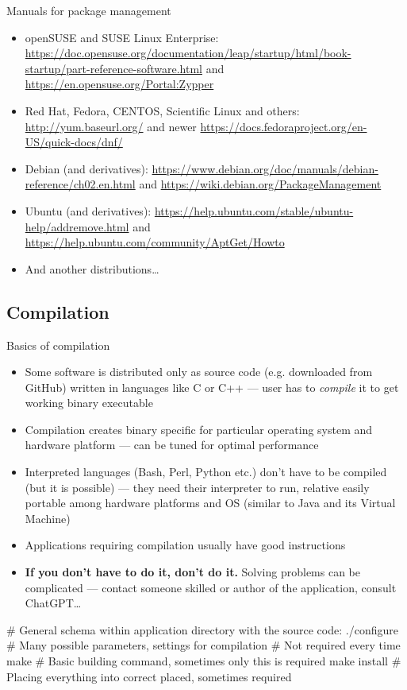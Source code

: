 \documentclass[compress, xelatex, 11pt, xcolor=svgnames, aspectratio=169,
	hyperref={
		bookmarks=true,
		unicode=true,
		colorlinks=true,
		pdftitle={Linux, command line and MetaCentrum},
		plainpages=false,
		pdfauthor={Vojtech Zeisek},
		pdfsubject={Course about use of Linux command line, writing shell scripts and using MetaCentrum of CESNET},
		pdfcreator={XeLaTeX},
		pdfkeywords={Linux, GNU, BASH, shell, command line, MetaCentrum},
		linkcolor=DarkRed, %
		anchorcolor=DarkBlue, %
		citecolor=Indigo, %
		filecolor=NavyBlue, %
		menucolor=DarkMagenta, %
		urlcolor=DarkBlue, %
		},
	url={hyphens, lowtilde} %
	]{beamer}
\begin{document}
\begin{frame}{Manuals for package management}
	\begin{itemize}
		\item openSUSE and SUSE Linux Enterprise: \url{https://doc.opensuse.org/documentation/leap/startup/html/book-startup/part-reference-software.html} and \url{https://en.opensuse.org/Portal:Zypper}
		\item Red Hat, Fedora, CENTOS, Scientific Linux and others: \url{http://yum.baseurl.org/} and newer \url{https://docs.fedoraproject.org/en-US/quick-docs/dnf/}
		\item Debian (and derivatives): \url{https://www.debian.org/doc/manuals/debian-reference/ch02.en.html} and \url{https://wiki.debian.org/PackageManagement}
		\item Ubuntu (and derivatives): \url{https://help.ubuntu.com/stable/ubuntu-help/addremove.html} and \url{https://help.ubuntu.com/community/AptGet/Howto}
		\item And another distributions\ldots
	\end{itemize}
\end{frame}

\subsection{Compilation}

\begin{frame}[fragile]{Basics of compilation}
	\begin{itemize}
		\item Some software is distributed only as source code (e.g. downloaded from GitHub) written in languages like C or C++ --- user has to \textit{compile} it to get working binary executable
		\item Compilation creates binary specific for particular operating system and hardware platform --- can be tuned for optimal performance
		\item Interpreted languages (Bash, Perl, Python etc.) don't have to be compiled (but it is possible) --- they need their interpreter to run, relative easily portable among hardware platforms and OS (similar to Java and its Virtual Machine)
		\item Applications requiring compilation usually have good instructions
		\item \textbf{If you don't have to do it, don't do it.}\textbf{} Solving problems can be complicated --- contact someone skilled or author of the application, consult ChatGPT\ldots
	\end{itemize}
	\begin{bashcode}
    # General schema within application directory with the source code:
    ./configure # Many possible parameters, settings for compilation
                # Not required every time
    make # Basic building command, sometimes only this is required
    make install # Placing everything into correct placed, sometimes required
	\end{bashcode}
\end{frame}
\end{document}
